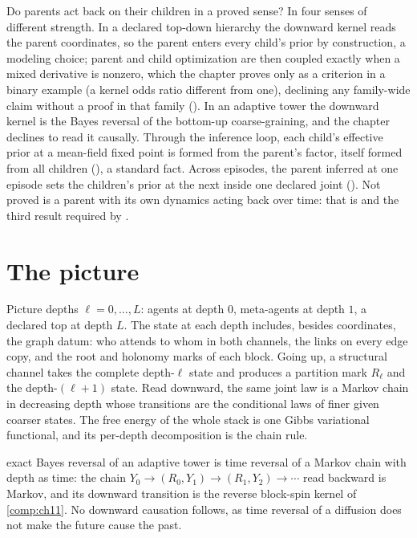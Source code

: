 Do parents act back on their children in a proved sense? In four senses of different strength. In a
declared top-down hierarchy the downward kernel reads the parent coordinates, so the parent enters every
child's prior by construction, a modeling choice; parent and child optimization are then coupled
exactly when a mixed derivative is nonzero, which the chapter proves only as a criterion in a binary
example (a kernel odds ratio different from one), declining any family-wide claim without a proof in
that family (). In an adaptive tower the downward kernel is the
Bayes reversal of the bottom-up coarse-graining, and the chapter declines to read it causally. Through
the inference loop, each child's effective prior at a mean-field fixed point is formed from the parent's
factor, itself formed from all children (), a standard fact. Across
episodes, the parent inferred at one episode sets the children's prior at the next inside one declared
joint (). Not proved is a parent with its own dynamics acting back over
time: that is  and the third result required by
.

\section{The picture}
\label{comp:ch12-picture}

Picture depths $\ell=0,\ldots,L$: agents at depth $0$, meta-agents at depth $1$, a declared top at depth
$L$. The state at each depth includes, besides coordinates, the graph datum: who attends to whom in both
channels, the links on every edge copy, and the root and holonomy marks of each block. Going up, a
structural channel takes the complete depth-$\ell$ state and produces a partition mark $R_\ell$ and the
depth-$(\ell+1)$ state. Read downward, the same joint law is a Markov chain in decreasing depth whose
transitions are the conditional laws of finer given coarser states. The free energy of the whole stack
is one Gibbs variational functional, and its per-depth decomposition is the chain rule.

\begin{analogy}{exact}
Bayes reversal of an adaptive tower is time reversal of a Markov chain with depth as time: the chain
$Y_0\to(R_0,Y_1)\to(R_1,Y_2)\to\cdots$ read backward is Markov, and its downward transition is the
reverse block-spin kernel of \cref{comp:ch11}. No downward causation follows, as time reversal of a
diffusion does not make the future cause the past.
\end{analogy}

